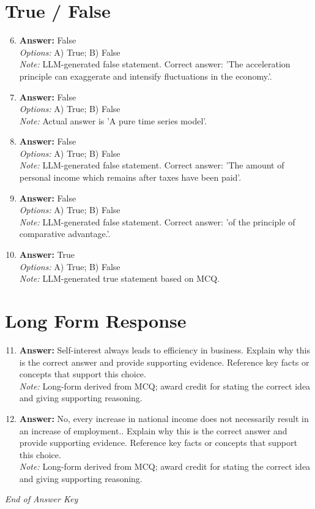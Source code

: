 \documentclass[12pt]{article}
\begin{document}
\section*{True / False}
\begin{enumerate}[label=\arabic*.]
\setcounter{enumi}{5}
\item \textbf{Answer:} False
\\ \textit{Options:} A) True; B) False
\\ \textit{Note:} LLM-generated false statement. Correct answer: 'The acceleration principle can exaggerate and intensify fluctuations in the economy.'.
\item \textbf{Answer:} False
\\ \textit{Options:} A) True; B) False
\\ \textit{Note:} Actual answer is 'A pure time series model'.
\item \textbf{Answer:} False
\\ \textit{Options:} A) True; B) False
\\ \textit{Note:} LLM-generated false statement. Correct answer: 'The amount of personal income which remains after taxes have been paid'.
\item \textbf{Answer:} False
\\ \textit{Options:} A) True; B) False
\\ \textit{Note:} LLM-generated false statement. Correct answer: 'of the principle of comparative advantage.'.
\item \textbf{Answer:} True
\\ \textit{Options:} A) True; B) False
\\ \textit{Note:} LLM-generated true statement based on MCQ.
\end{enumerate}

\section*{Long Form Response}
\begin{enumerate}[label=\arabic*.]
\setcounter{enumi}{10}
\item \textbf{Answer:} Self-interest always leads to efficiency in business. Explain why this is the correct answer and provide supporting evidence. Reference key facts or concepts that support this choice.
\\ \textit{Note:} Long-form derived from MCQ; award credit for stating the correct idea and giving supporting reasoning.
\item \textbf{Answer:} No, every increase in national income does not necessarily result in an increase of employment.. Explain why this is the correct answer and provide supporting evidence. Reference key facts or concepts that support this choice.
\\ \textit{Note:} Long-form derived from MCQ; award credit for stating the correct idea and giving supporting reasoning.
\end{enumerate}

\vfill
\noindent\textit{End of Answer Key}
\end{document}
